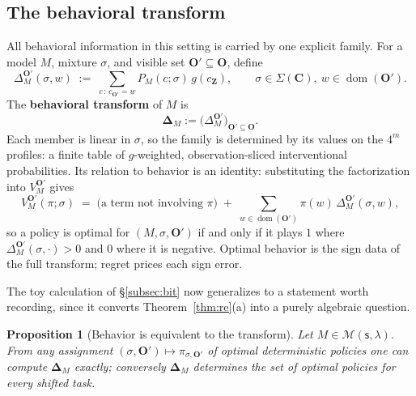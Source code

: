 \documentclass[11pt]{amsart}
\theoremstyle{plain}
\newtheorem{proposition}[theorem]{Proposition}
\theoremstyle{definition}
\DeclareMathOperator{\dom}{dom}
\newcommand{\bC}{\mathbf{C}}
\newcommand{\bO}{\mathbf{O}}
\newcommand{\bZ}{\mathbf{Z}}
\newcommand{\MM}{\mathcal{M}}
\newcommand{\sk}{\mathsf{s}}
\begin{document}
\subsection{The behavioral transform}

All behavioral information in this setting is carried by one explicit family. For a model $M$, mixture $\sigma$, and visible set $\bO'\subseteq\bO$, define
\[
   \Delta_M^{\bO'}(\sigma,w)\;:=\;\sum_{c\,:\,c_{\bO'}=w} P_M(c;\sigma)\,g(c_\bZ),
   \qquad \sigma\in\Sigma(\bC),\ w\in\dom(\bO').
\]
The \textbf{behavioral transform} of $M$ is
\[
   \boldsymbol\Delta_M:=\bigl(\Delta_M^{\bO'}\bigr)_{\bO'\subseteq\bO}.
\]
Each member is linear in $\sigma$, so the family is determined by its values on the $4^m$ profiles: a finite table of $g$-weighted, observation-sliced interventional probabilities. Its relation to behavior is an identity: substituting the factorization into $V_M^{\bO'}$ gives
\begin{equation}\label{eq:decomp}
   V_M^{\bO'}(\pi;\sigma)\;=\;\text{(a term not involving $\pi$)}\;+\;\sum_{w\in\dom(\bO')}\pi(w)\,\Delta_M^{\bO'}(\sigma,w),
\end{equation}
so a policy is optimal for $(M,\sigma,\bO')$ if and only if it plays $1$ where $\Delta_M^{\bO'}(\sigma,\cdot)>0$ and $0$ where it is negative. Optimal behavior is the sign data of the full transform; regret prices each sign error.

The toy calculation of \S\ref{subsec:bit} now generalizes to a statement worth recording, since it converts Theorem~\ref{thm:re}(a) into a purely algebraic question.

\begin{proposition}[Behavior is equivalent to the transform]\label{prop:equiv}
Let $M\in\MM(\sk,\lambda)$. From any assignment $(\sigma,\bO')\mapsto\pi_{\sigma,\bO'}$ of optimal deterministic policies one can compute $\boldsymbol\Delta_M$ exactly; conversely $\boldsymbol\Delta_M$ determines the set of optimal policies for every shifted task.
\end{proposition}
\end{document}
